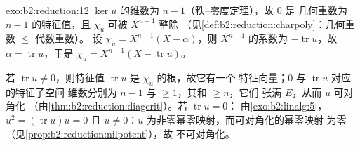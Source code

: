\begin{solution}{exo:b2:reduction:12}
$\ker u$ 的维数为 $n - 1$（秩–零度定理），故 $0$ 是
几何重数为 $n - 1$ 的特征值，且 $\chi_u$ 可被
$X^{n-1}$ 整除
（见\cref{def:b2:reduction:charpoly}：几何重数 $\leq$ 代数重数）。
设 $\chi_u = X^{n-1}(X - \alpha)$，则
$X^{n-1}$ 的系数为 $-\operatorname{tr} u$，故 $\alpha =
\operatorname{tr} u$，于是 $\chi_u = X^{n-1}(X - \operatorname{tr}
u)$。

若 $\operatorname{tr} u \neq 0$，则特征值
$\operatorname{tr} u$ 是 $\chi_u$ 的根，故它有一个
特征向量；$0$ 与 $\operatorname{tr} u$ 对应的特征子空间
维数分别为 $n - 1$ 与 $\geq 1$，其和 $\geq n$，它们
张满 $E$，从而 $u$ 可对角化
（由\cref{thm:b2:reduction:diagcrit}）。若 $\operatorname{tr} u = 0$：
由\cref{exo:b2:linalg:5}，$u^2 = (\operatorname{tr} u)u = 0$
且 $u \neq 0$：$u$ 为非零幂零映射，而可对角化的幂零映射
为零（见\cref{prop:b2:reduction:nilpotent}），故
不可对角化。
\end{solution}

